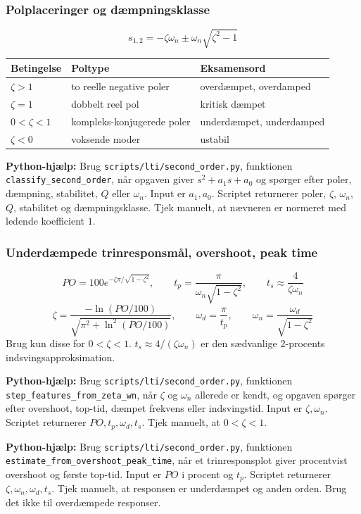 \subsubsection{Polplaceringer og dæmpningsklasse}
\[
s_{1,2}=-\zeta\omega_n\pm \omega_n\sqrt{\zeta^2-1}
\]
\begin{tabular}{lll}
\toprule
Betingelse & Poltype & Eksamensord \\
\midrule
\(\zeta>1\) & to reelle negative poler & overdæmpet, overdamped \\
\(\zeta=1\) & dobbelt reel pol & kritisk dæmpet \\
\(0<\zeta<1\) & kompleks-konjugerede poler & underdæmpet, underdamped \\
\(\zeta<0\) & voksende moder & ustabil \\
\bottomrule
\end{tabular}

\textbf{Python-hjælp:} Brug \texttt{scripts/lti/second\_order.py}, funktionen \texttt{classify\_second\_order}, når opgaven giver \(s^2+a_1s+a_0\) og spørger efter poler, dæmpning, stabilitet, \(Q\) eller \(\omega_n\). Input er \(a_1,a_0\). Scriptet returnerer poler, \(\zeta\), \(\omega_n\), \(Q\), stabilitet og dæmpningsklasse. Tjek manuelt, at nævneren er normeret med ledende koefficient \(1\).

\subsubsection{Underdæmpede trinresponsmål, overshoot, peak time}
\[
PO=100e^{-\zeta\pi/\sqrt{1-\zeta^2}},\qquad
t_p=\frac{\pi}{\omega_n\sqrt{1-\zeta^2}},\qquad
t_s\approx\frac{4}{\zeta\omega_n}
\]
\[
\zeta=\frac{-\ln(PO/100)}{\sqrt{\pi^2+\ln^2(PO/100)}},\qquad
\omega_d=\frac{\pi}{t_p},\qquad
\omega_n=\frac{\omega_d}{\sqrt{1-\zeta^2}}
\]
Brug kun disse for \(0<\zeta<1\). \(t_s\approx4/(\zeta\omega_n)\) er den sædvanlige 2-procents indsvingsapproksimation.

\textbf{Python-hjælp:} Brug \texttt{scripts/lti/second\_order.py}, funktionen \texttt{step\_features\_from\_zeta\_wn}, når \(\zeta\) og \(\omega_n\) allerede er kendt, og opgaven spørger efter overshoot, top-tid, dæmpet frekvens eller indsvingstid. Input er \(\zeta,\omega_n\). Scriptet returnerer \(PO,t_p,\omega_d,t_s\). Tjek manuelt, at \(0<\zeta<1\).

\textbf{Python-hjælp:} Brug \texttt{scripts/lti/second\_order.py}, funktionen \texttt{estimate\_from\_overshoot\_peak\_time}, når et trinresponsplot giver procentvist overshoot og første top-tid. Input er \(PO\) i procent og \(t_p\). Scriptet returnerer \(\zeta,\omega_n,\omega_d,t_s\). Tjek manuelt, at responsen er underdæmpet og anden orden. Brug det ikke til overdæmpede responser.

